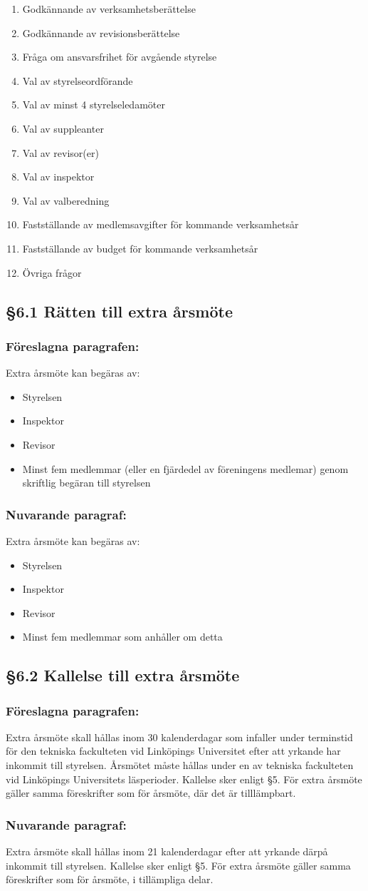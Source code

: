 \documentclass[11pt,a4paper]{article}
\newcommand{\change}[3]{\subsection*{#1}
  \subsubsection*{Föreslagna paragrafen:}
  #2
  \subsubsection*{Nuvarande paragraf:}
  #3}
\begin{document}
{\begin{enumerate}
\item Godkännande av verksamhetsberättelse
\item Godkännande av revisionsberättelse
\item Fråga om ansvarsfrihet för avgående styrelse
\item Val av styrelseordförande
\item Val av minst 4 styrelseledamöter
\item Val av suppleanter
\item Val av revisor(er)
\item Val av inspektor
\item Val av valberedning
\item Fastställande av medlemsavgifter för kommande verksamhetsår
\item Fastställande av budget för kommande verksamhetsår
\item Övriga frågor
\end{enumerate}}

\change{§6.1 Rätten till extra årsmöte}{
Extra årsmöte kan begäras av:
\begin{itemize}
\item Styrelsen
\item Inspektor
\item Revisor
\item Minst fem medlemmar (eller en fjärdedel av föreningens medlemar)
genom skriftlig begäran till styrelsen
\end{itemize}}{
Extra årsmöte kan begäras av:
\begin{itemize}
\item Styrelsen
\item Inspektor
\item Revisor
\item Minst fem medlemmar som anhåller om detta
\end{itemize}}



\change{§6.2 Kallelse till extra årsmöte}{
Extra årsmöte skall hållas inom 30 kalenderdagar som infaller under
terminstid för den tekniska fackulteten vid Linköpings Universitet efter att
yrkande har inkommit till styrelsen. Årsmötet måste hållas under en av
tekniska fackulteten vid Linköpings Universitets läsperioder.
Kallelse sker enligt §5.
För extra årsmöte gäller samma föreskrifter som för årsmöte,
där det är tilllämpbart.}{
Extra årsmöte skall hållas inom 21 kalenderdagar efter att yrkande därpå inkommit till styrelsen. Kallelse sker enligt §5. För extra årsmöte gäller samma föreskrifter som för årsmöte, i tillämpliga delar.}
\end{document}
